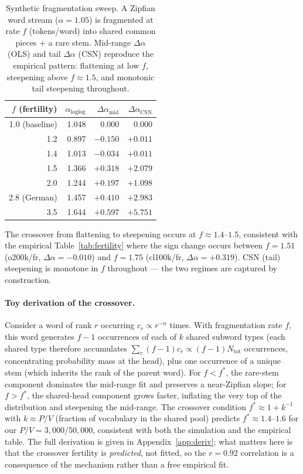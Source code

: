 \documentclass{article}
\begin{document}
\begin{table}[h]
  \caption{Synthetic fragmentation sweep. A Zipfian word stream ($\alpha=1.05$) is
    fragmented at rate $f$ (tokens/word) into shared common pieces + a rare stem.
    Mid-range $\Delta\alpha$ (OLS) and tail $\Delta\alpha$ (CSN) reproduce the
    empirical pattern: flattening at low $f$, steepening above $f\approx 1.5$,
    and monotonic tail steepening throughout.}
  \label{tab:synth}
  \centering\small
  \begin{tabular}{rrrr}
    \toprule
    $f$ (fertility) & $\alpha_{\text{loglog}}$ & $\Delta\alpha_{\text{mid}}$ & $\Delta\alpha_{\text{CSN}}$ \\
    \midrule
    1.0 (baseline) & 1.048 & $0.000$ & $0.000$ \\
    1.2            & 0.897 & $-0.150$ & $+0.011$ \\
    1.4            & 1.013 & $-0.034$ & $+0.011$ \\
    1.5            & 1.366 & $+0.318$ & $+2.079$ \\
    2.0            & 1.244 & $+0.197$ & $+1.098$ \\
    2.8 (German)   & 1.457 & $+0.410$ & $+2.983$ \\
    3.5            & 1.644 & $+0.597$ & $+5.751$ \\
    \bottomrule
  \end{tabular}
\end{table}

The crossover from flattening to steepening occurs at $f \approx 1.4$--$1.5$, consistent
with the empirical Table~\ref{tab:fertility} where the sign change occurs between
$f=1.51$ (o200k/fr, $\Delta\alpha = -0.010$) and $f=1.75$ (cl100k/fr, $\Delta\alpha =
+0.319$). CSN (tail) steepening is monotone in $f$ throughout --- the two regimes are
captured by construction.

\paragraph{Toy derivation of the crossover.}
Consider a word of rank $r$ occurring $c_r \propto r^{-\alpha}$ times. With fragmentation
rate $f$, this word generates $f-1$ occurrences of each of $k$ shared subword types
(each shared type therefore accumulates $\sum_r (f-1) c_r \propto (f-1) N_{\text{tot}}$
occurrences, concentrating probability mass at the head), plus one occurrence of a unique
stem (which inherits the rank of the parent word). For $f < f^*$, the rare-stem component
dominates the mid-range fit and preserves a near-Zipfian slope; for $f > f^*$, the
shared-head component grows faster, inflating the very top of the distribution and
steepening the mid-range. The crossover condition $f^* \approx 1 + k^{-1}$ with $k
\approx P/V$ (fraction of vocabulary in the shared pool) predicts $f^* \approx 1.4$--$1.6$
for our $P/V = 3{,}000/50{,}000$, consistent with both the simulation and the empirical
table. The full derivation is given in Appendix~\ref{app:deriv}; what matters here is
that the crossover fertility is \emph{predicted}, not fitted, so the $r = 0.92$
correlation is a consequence of the mechanism rather than a free empirical fit.
\end{document}
